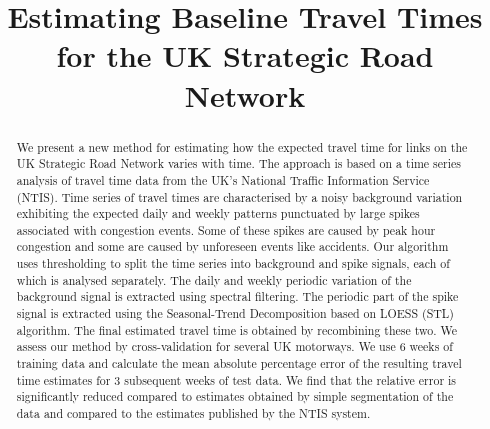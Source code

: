\documentclass[conference]{IEEEtran}
\begin{document}
\title{Estimating Baseline Travel Times for the UK Strategic Road Network
}

\author{
\and
{}
\and
{}
}

\maketitle

\begin{abstract}
We present a new method for estimating how the expected travel time for links on the UK Strategic Road Network varies with time.  
The approach is based on a time series analysis of travel time data from the UK's National Traffic Information Service (NTIS).  
Time series of travel times are characterised by a noisy background variation exhibiting the expected daily and weekly patterns punctuated by large spikes associated with congestion events. 
Some of these spikes are caused by peak hour congestion and some are caused by unforeseen events like accidents. 
Our algorithm uses thresholding to split the time series into background and spike signals, each of which is analysed separately. 
The daily and weekly periodic variation of the background signal is extracted using spectral filtering. 
The periodic part of the spike signal is extracted using the Seasonal-Trend Decomposition based on LOESS (STL) algorithm. 
The final estimated travel time is obtained by recombining these two. 
We assess our method by cross-validation for several UK motorways. 
We use 6 weeks of training data and calculate the mean absolute percentage error of the resulting travel time estimates for 3 subsequent weeks of test data. 
We find that the relative error is significantly reduced compared to estimates obtained by simple segmentation of the data and compared to the estimates published by the NTIS system.
\end{abstract}
\end{document}
